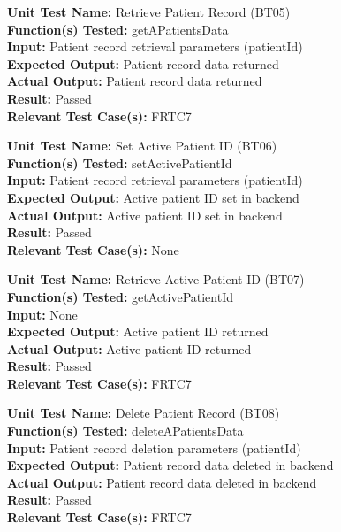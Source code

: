 \documentclass[12pt, titlepage]{article}
\begin{document}
\begin{mdframed}[linewidth=0.5mm]
  \textbf{Unit Test Name:} Retrieve Patient Record (BT05) \\
  \textbf{Function(s) Tested:} getAPatientsData \\
  \textbf{Input:} Patient record retrieval parameters (patientId) \\
  \textbf{Expected Output:} Patient record data returned \\
  \textbf{Actual Output:} Patient record data returned \\
  \textbf{Result:} Passed \\
  \textbf{Relevant Test Case(s):} FRTC7
\end{mdframed}

\begin{mdframed}[linewidth=0.5mm]
  \textbf{Unit Test Name:} Set Active Patient ID (BT06) \\
  \textbf{Function(s) Tested:} setActivePatientId \\
  \textbf{Input:} Patient record retrieval parameters (patientId) \\
  \textbf{Expected Output:} Active patient ID set in backend \\
  \textbf{Actual Output:} Active patient ID set in backend \\
  \textbf{Result:} Passed \\
  \textbf{Relevant Test Case(s):} None
\end{mdframed}

\begin{mdframed}[linewidth=0.5mm]
  \textbf{Unit Test Name:} Retrieve Active Patient ID (BT07) \\
  \textbf{Function(s) Tested:} getActivePatientId \\
  \textbf{Input:} None \\
  \textbf{Expected Output:} Active patient ID returned \\
  \textbf{Actual Output:} Active patient ID returned \\
  \textbf{Result:} Passed \\
  \textbf{Relevant Test Case(s):} FRTC7
\end{mdframed}

\begin{mdframed}[linewidth=0.5mm]
  \textbf{Unit Test Name:} Delete Patient Record (BT08) \\
  \textbf{Function(s) Tested:} deleteAPatientsData \\
  \textbf{Input:} Patient record deletion parameters (patientId) \\
  \textbf{Expected Output:} Patient record data deleted in backend \\
  \textbf{Actual Output:} Patient record data deleted in backend \\
  \textbf{Result:} Passed \\
  \textbf{Relevant Test Case(s):} FRTC7
\end{mdframed}
\end{document}
